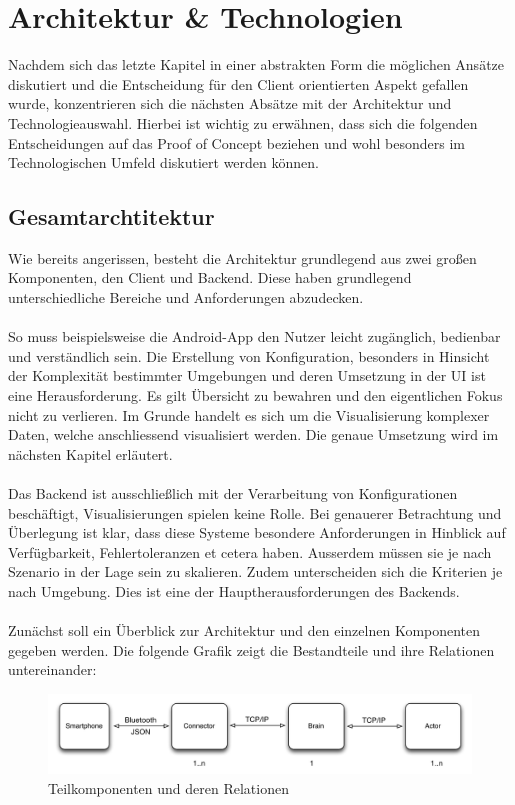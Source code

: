 \chapter{Architektur \& Technologien}
Nachdem sich das letzte Kapitel in einer abstrakten Form die möglichen Ansätze diskutiert und die Entscheidung für den Client orientierten Aspekt gefallen wurde, konzentrieren sich die nächsten Absätze mit der Architektur und Technologieauswahl. 
Hierbei ist wichtig zu erwähnen, dass sich die folgenden Entscheidungen auf das Proof of Concept beziehen und wohl besonders im Technologischen Umfeld diskutiert werden können.

\section{Gesamtarchtitektur}
Wie bereits angerissen, besteht die Architektur grundlegend aus zwei großen Komponenten, den Client und Backend. Diese haben grundlegend unterschiedliche Bereiche und Anforderungen abzudecken. 
\\\\
So muss beispielsweise die Android-App den Nutzer leicht zugänglich, bedienbar und verständlich sein. Die Erstellung von Konfiguration, besonders in Hinsicht der Komplexität bestimmter Umgebungen und deren Umsetzung in der UI ist eine Herausforderung. Es gilt Übersicht zu bewahren und den eigentlichen Fokus nicht zu verlieren. Im Grunde handelt es sich um die Visualisierung komplexer Daten, welche anschliessend visualisiert werden. Die genaue Umsetzung wird im nächsten Kapitel erläutert. 
\\\\
Das Backend ist ausschließlich mit der Verarbeitung von Konfigurationen beschäftigt, Visualisierungen spielen keine Rolle. Bei genauerer Betrachtung und Überlegung ist klar, dass diese Systeme besondere Anforderungen in Hinblick auf Verfügbarkeit, Fehlertoleranzen et cetera haben. Ausserdem müssen sie je nach Szenario in der Lage sein zu skalieren. Zudem unterscheiden sich die Kriterien je nach Umgebung. Dies ist eine der Hauptherausforderungen des Backends. 
\\\\
Zunächst soll ein Überblick zur Architektur und den einzelnen Komponenten gegeben werden. Die folgende Grafik zeigt die Bestandteile und ihre Relationen untereinander:

\begin{figure}[H]
\includegraphics[width=12.5cm]{images/architecture}
\caption{Teilkomponenten und deren Relationen}
\end{figure}

